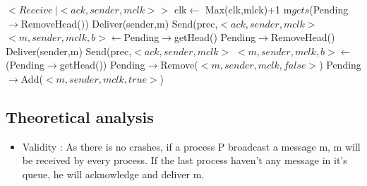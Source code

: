 \documentclass[a4paper]{article}
\begin{document}
\begin{algorithm}[H]
    \centering
    \begin{algorithmic}[5]

        \Event $<Receive\  | <ack,sender, mclk>>$
        \State clk$\gets$ Max(clk,mlck)+1
        \State m$gets$(Pending$\rightarrow$RemoveHead())
        \State Deliver(sender,m)
        \State Send(prec,$<ack,sender,mclk>$
        \EndIf
        \State $<m,sender,mclk,b>\gets$Pending$\rightarrow$getHead()
        \State Pending$\rightarrow$RemoveHead()
        \State Deliver(sender,m)
        \State Send(prec,$<ack,sender,mclk>$
        \EndIf
        \State $<m,sender,mclk,b>\gets$(Pending$\rightarrow$getHead())
        \EndWhile
        \Else
        \State Pending$\rightarrow$Remove($<m,sender,mclk,false>$)
        \State Pending$\rightarrow$Add($<m,sender,mclk,true>$)
        \EndIf
        \EndEvent
    \end{algorithmic}
\end{algorithm}

\subsection{Theoretical analysis}
\begin{itemize}
    \item Validity : As there  is no crashes, if a process P broadcast a
        message m, m will be received by every process. If the last
        process haven't any message in it's queue, he will acknowledge
        and deliver m. 
\end{itemize}
\label{sec:pipelineack-proof}
\end{document}

